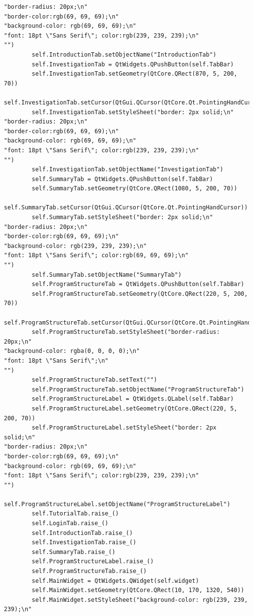 \documentclass{article}
\begin{document}
\begin{lstlisting}
"border-radius: 20px;\n"
"border-color:rgb(69, 69, 69);\n"
"background-color: rgb(69, 69, 69);\n"
"font: 18pt \"Sans Serif\"; color:rgb(239, 239, 239);\n"
"")
        self.IntroductionTab.setObjectName("IntroductionTab")
        self.InvestigationTab = QtWidgets.QPushButton(self.TabBar)
        self.InvestigationTab.setGeometry(QtCore.QRect(870, 5, 200, 70))
        self.InvestigationTab.setCursor(QtGui.QCursor(QtCore.Qt.PointingHandCursor))
        self.InvestigationTab.setStyleSheet("border: 2px solid;\n"
"border-radius: 20px;\n"
"border-color:rgb(69, 69, 69);\n"
"background-color: rgb(69, 69, 69);\n"
"font: 18pt \"Sans Serif\"; color:rgb(239, 239, 239);\n"
"")
        self.InvestigationTab.setObjectName("InvestigationTab")
        self.SummaryTab = QtWidgets.QPushButton(self.TabBar)
        self.SummaryTab.setGeometry(QtCore.QRect(1080, 5, 200, 70))
        self.SummaryTab.setCursor(QtGui.QCursor(QtCore.Qt.PointingHandCursor))
        self.SummaryTab.setStyleSheet("border: 2px solid;\n"
"border-radius: 20px;\n"
"border-color:rgb(69, 69, 69);\n"
"background-color: rgb(239, 239, 239);\n"
"font: 18pt \"Sans Serif\"; color:rgb(69, 69, 69);\n"
"")
        self.SummaryTab.setObjectName("SummaryTab")
        self.ProgramStructureTab = QtWidgets.QPushButton(self.TabBar)
        self.ProgramStructureTab.setGeometry(QtCore.QRect(220, 5, 200, 70))
        self.ProgramStructureTab.setCursor(QtGui.QCursor(QtCore.Qt.PointingHandCursor))
        self.ProgramStructureTab.setStyleSheet("border-radius: 20px;\n"
"background-color: rgba(0, 0, 0, 0);\n"
"font: 18pt \"Sans Serif\";\n"
"")
        self.ProgramStructureTab.setText("")
        self.ProgramStructureTab.setObjectName("ProgramStructureTab")
        self.ProgramStructureLabel = QtWidgets.QLabel(self.TabBar)
        self.ProgramStructureLabel.setGeometry(QtCore.QRect(220, 5, 200, 70))
        self.ProgramStructureLabel.setStyleSheet("border: 2px solid;\n"
"border-radius: 20px;\n"
"border-color:rgb(69, 69, 69);\n"
"background-color: rgb(69, 69, 69);\n"
"font: 18pt \"Sans Serif\"; color:rgb(239, 239, 239);\n"
"")
        self.ProgramStructureLabel.setObjectName("ProgramStructureLabel")
        self.TutorialTab.raise_()
        self.LoginTab.raise_()
        self.IntroductionTab.raise_()
        self.InvestigationTab.raise_()
        self.SummaryTab.raise_()
        self.ProgramStructureLabel.raise_()
        self.ProgramStructureTab.raise_()
        self.MainWidget = QtWidgets.QWidget(self.widget)
        self.MainWidget.setGeometry(QtCore.QRect(10, 170, 1320, 540))
        self.MainWidget.setStyleSheet("background-color: rgb(239, 239, 239);\n"

\end{lstlisting}
\end{document}
